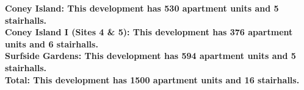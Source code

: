 \bf{Coney Island}: This development has 530 apartment units and 5 stairhalls.\\\bf{Coney Island I (Sites 4 & 5)}: This development has 376 apartment units and 6 stairhalls.\\\bf{Surfside Gardens}: This development has 594 apartment units and 5 stairhalls.\\\bf{Total}: This development has 1500 apartment units and 16 stairhalls.\\